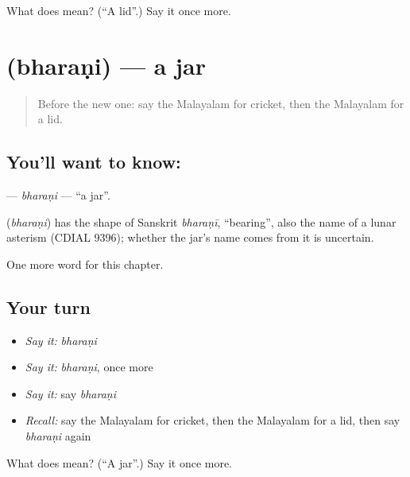 \begin{tcolorbox}[breakable,colback=teal!4,colframe=teal!35!black,title={Before you move on}]
What does  mean? (\textquotedblleft{}A lid\textquotedblright{}.) Say it once more.
\end{tcolorbox}
\section[\texorpdfstring{\ml{ഭരണി} (bharaṇi)}{ഭരണി (bharaṇi)}]{ (bharaṇi) — a jar}

\label{lesson:ML-C330-bharani}



\begin{quote}
Before the new one: say the Malayalam for cricket, then the Malayalam for a lid.
\end{quote}

\subsection*{You'll want to know: }
\textbf{} — \emph{bharaṇi} — \textquotedblleft{}a jar\textquotedblright{}.

\begin{cousinweb}
\textbf{} (\emph{bharaṇi}) has the shape of Sanskrit \emph{bharaṇī}, \textquotedblleft{}bearing\textquotedblright{}, also the name of a lunar asterism (CDIAL 9396); whether the jar's name comes from it is uncertain.
\end{cousinweb}

\begin{grammarlens}[title={What you've built}]
One more word for this chapter.
\end{grammarlens}

\subsection*{Your turn}
\begin{itemize}
\raggedright
  \item \emph{Say it:} \emph{bharaṇi}
  \item \emph{Say it:} \emph{bharaṇi}, once more
  \item \emph{Say it:} say \emph{bharaṇi}
  \item \emph{Recall:} say the Malayalam for cricket, then the Malayalam for a lid, then say \emph{bharaṇi} again
\end{itemize}

\begin{tcolorbox}[breakable,colback=teal!4,colframe=teal!35!black,title={Before you move on}]
What does  mean? (\textquotedblleft{}A jar\textquotedblright{}.) Say it once more.
\end{tcolorbox}
